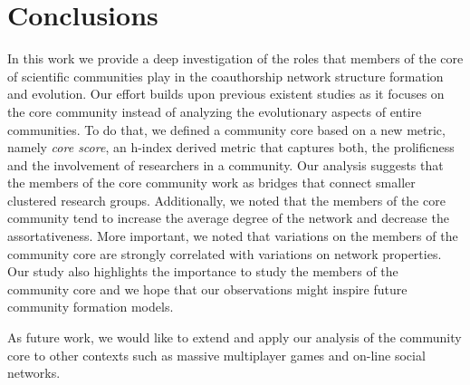 
\section{Conclusions}

In this work we provide a deep investigation of the roles that members of the core of scientific communities play in the coauthorship network structure formation and evolution.
Our effort builds upon previous existent studies as it focuses on the core community instead of analyzing the evolutionary aspects of entire communities.  To do that, we defined a
community core based on a new metric, namely \textit{core score}, an h-index derived metric that captures both, the prolificness and the involvement of researchers in a community. Our analysis
suggests that the members of the core community work as bridges that connect smaller clustered research groups. Additionally, we noted that the members of the core community tend to
increase the average degree of the network and decrease the assortativeness. More important, we noted that variations on the members of the community core are strongly correlated
with variations on network properties.  Our study also highlights the importance to study the members of the community core and we hope that our observations might inspire future
community formation models.

As future work, we would like to extend and apply our analysis of the community core to other contexts such as massive multiplayer games and on-line social networks.



